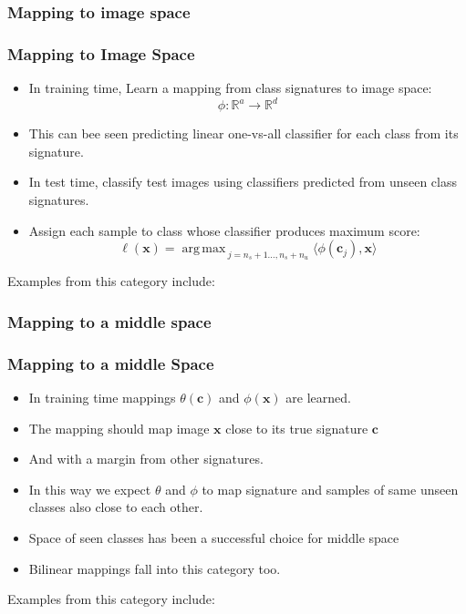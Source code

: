 \documentclass{beamer}
\DeclareMathOperator*{\argmax}{arg\,max\,}
\begin{document}
\subsubsection{Mapping to image space}
\begin{frame}
  \frametitle{Mapping to Image Space}
\begin{itemize}
    \item In training time, Learn a mapping from class signatures to image space:
    \[ \phi: \mathbb{R}^{a} \to \mathbb{R}^d \]
    \item This can bee seen predicting linear one-vs-all classifier for each class from its signature.
    \item In test time, classify test images using classifiers predicted from unseen class signatures.
    \item Assign each sample to class whose classifier produces maximum score:
    \begin{equation}
      \ell(\mathbf{x}) = \argmax_{j=n_s+1 \ldots, n_s + n_u} \langle \phi(\mathbf{c}_j), \mathbf{x} \rangle
    \end{equation}
\end{itemize}

Examples from this category include: \cite{elhoseiny2015,Reed2016}
\end{frame}

\subsubsection{Mapping to a middle space}
\begin{frame}
  \frametitle{Mapping to a middle Space}
\begin{itemize}
    \item In training time  mappings $ \theta(\mathbf{c})$ and $\phi(\mathbf{x})$ are learned.
    \item The mapping should map image $\mathbf{x}$ close to its true signature $\mathbf{c}$
    \item And with a margin from other signatures.
    \item In this way we expect $\theta$ and $\phi$ to map signature and samples of same unseen classes also close to each other. \pause
    \item Space of seen classes has been a successful choice for middle space \pause
    \item Bilinear mappings fall into this category too.
\end{itemize}
\pause
Examples from this category include: \cite{ba2015,Reed2016}
\end{frame}
\end{document}

